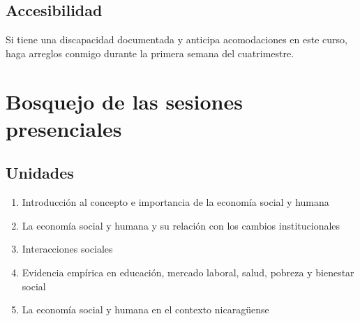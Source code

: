 \documentclass[12]{article}
\begin{document}
\subsection*{Accesibilidad}

Si tiene una discapacidad documentada y anticipa acomodaciones en este curso, haga arreglos conmigo durante la primera
semana del cuatrimestre.

\section*{Bosquejo de las sesiones presenciales}
\label{sec:outline}

\subsection*{Unidades}

\begin{enumerate}
\item Introducción al concepto e importancia de la economía social y humana
\item La economía social y humana y su relación con los cambios institucionales
\item Interacciones sociales
\item Evidencia empírica en educación, mercado laboral, salud, pobreza y bienestar social
\item La economía social y humana en el contexto nicaragüense
\end{enumerate}

\newpage 
\end{document}
